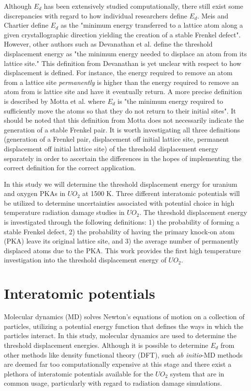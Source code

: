 \documentclass[8pt]{article}   	%
\begin{document}
Although $E_d$ has been extensively studied computationally, there still exist some discrepancies with regard to how individual researchers define $E_d$. Meis and Chartier \cite{meis2005} define $E_d$ as the "minimum energy transferred to a lattice atom along a given crystallographic direction yielding the creation of a stable Frenkel defect". However, other authors such as Devanathan et al. \cite{devanathan1998} define the threshold displacement energy as "the minimum energy needed to displace an atom from its lattice site." This definition from Devanathan is yet unclear with respect to how displacement is defined. For instance, the energy required to remove an atom from a lattice site \textit{permanently} is higher than the energy required to remove an atom from is lattice site and have it eventually return. A more precise definition is described by Motta et al. \cite{Motta}  where $E_d$ is "the minimum energy required to sufficiently move the atoms so that they do not return to their initial sites". It should be noted that this definition from Motta does not necessarily indicate the generation of a stable Frenkel pair. It is worth investigating all three definitions (generation of a Frenkel pair, displacement off initial lattice site, permanent displacement off initial lattice site) of the threshold displacement energy separately in order to ascertain the differences in the hopes of implementing the correct definition for the correct application.

In this study we will determine the threshold displacement energy for uranium and oxygen PKAs in $UO_2$ at 1500 K. Three different interatomic potentials will be utilized to determine uncertainties associated with potential choice in high temperature radiation damage studies in $UO_2$. The threshold displacement energy is investigated through the following definitions: 1) the probability of forming a stable Frenkel defect, 2) the probability of having the primary knock-on atom (PKA) leave its original lattice site, and 3) the average number of permanently displaced atoms due to the PKA. This work provides the first high temperature investigation into the threshold displacement energy of $UO_2$.

\section{Interatomic potentials}

\hspace{5mm}
Molecular dynamics (MD) solves Newton's equations of motion on a collection of particles, utilizing a potential energy function that defines the ways in which the particles interact. In this study, molecular dynamics are used to determine the threshold displacement energies. Although it is possible to determine $E_d$ from other methods like density functional theory (DFT), such \textit{ab initio}-MD methods are deemed far too computationally expensive at this stage and there exist a plethora of interatomic potentials available for the $UO_2$ system that are in common usage, particularly with regard to radiation damage simulations. 
\end{document}
